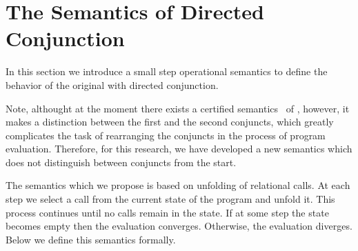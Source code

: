 \section{The Semantics of Directed Conjunction}
In this section we introduce a small step operational semantics to define the behavior of the original \mk with directed conjunction. 


Note, althought at the moment there exists a certified semantics~\cite{fair:semantics} of \mk, however, it makes a distinction between the first
and the second conjuncts, which greatly complicates the task of rearranging the conjuncts in the process of program evaluation. 
Therefore, for this research, we have developed a new semantics which does not distinguish between conjuncts from the start.


The semantics which we propose is based on unfolding of relational calls. At each step we select a call from the current state of the program and unfold it.
This process continues until no calls remain in the state. If at some step the state becomes empty then the evaluation converges. Otherwise, the evaluation diverges. Below we define this semantics formally.


